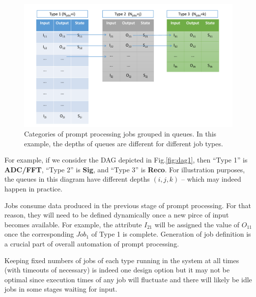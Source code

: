 \documentclass[pdftex,12pt,letter]{article}
\begin{document}
\begin{figure}[tbh]
  \centering
  \includegraphics[width=1.1\textwidth]{figures/prompt_queues_1.pdf}
  \caption{Categories of prompt processing jobs grouped in queues. In this example, the depths of queues are different for different job types.}
  \label{fig:queues1}
\end{figure}

For example, if we consider the DAG depicted in Fig.\ref{fig:dag1}, then ``Type 1''
is \textbf{ADC/FFT}, ``Type 2'' is \textbf{Sig}, and ``Type 3'' is \textbf{Reco}. For illustration purposes,
the queues in this diagram have different depths $(i,j,k)$  -- which may indeed happen in practice.

Jobs consume data produced in the previous stage of prompt processing. For that reason, they
will need to be defined dynamically once a new pirce of input becomes available. For example,
the attribute $I_{21}$ will be assigned the value of $O_{11}$ once the corresponding $Job_1$ of Type 1
is complete. Generation of job definition is a crucial part of overall automation of prompt processing.

Keeping fixed numbers of jobs of each type running in the system at all times (with timeouts of necessary)
is indeed one design option but it may not be optimal since execution times of any job will fluctuate and there
will likely be idle jobs in some stages waiting for input.
\end{document}
